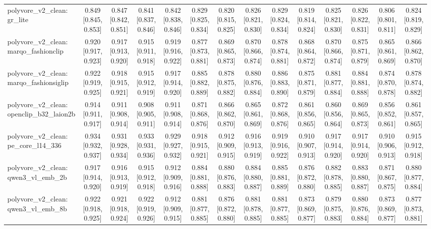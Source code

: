 \begin{table}[t]
\begin{tabular}{lccccccccccccc}
polyvore\_v2\_clean: gr\_lite & 0.849 [0.845, 0.853] & 0.847 [0.842, 0.851] & 0.841 [0.837, 0.846] & 0.842 [0.838, 0.846] & 0.829 [0.825, 0.834] & 0.820 [0.815, 0.825] & 0.826 [0.821, 0.830] & 0.829 [0.824, 0.834] & 0.819 [0.814, 0.824] & 0.825 [0.821, 0.830] & 0.826 [0.822, 0.831] & 0.806 [0.801, 0.811] & 0.824 [0.819, 0.829] \\
polyvore\_v2\_clean: marqo\_fashionclip & 0.920 [0.917, 0.923] & 0.917 [0.913, 0.920] & 0.915 [0.911, 0.918] & 0.919 [0.916, 0.922] & 0.877 [0.873, 0.881] & 0.869 [0.865, 0.873] & 0.870 [0.866, 0.874] & 0.878 [0.874, 0.881] & 0.868 [0.864, 0.872] & 0.870 [0.866, 0.874] & 0.875 [0.871, 0.879] & 0.865 [0.861, 0.869] & 0.866 [0.862, 0.870] \\
polyvore\_v2\_clean: marqo\_fashionsiglip & 0.922 [0.919, 0.925] & 0.918 [0.915, 0.921] & 0.915 [0.912, 0.919] & 0.917 [0.914, 0.920] & 0.885 [0.882, 0.889] & 0.878 [0.875, 0.882] & 0.880 [0.876, 0.884] & 0.886 [0.883, 0.890] & 0.875 [0.871, 0.879] & 0.881 [0.877, 0.884] & 0.884 [0.881, 0.888] & 0.874 [0.870, 0.878] & 0.878 [0.874, 0.882] \\
polyvore\_v2\_clean: openclip\_b32\_laion2b & 0.914 [0.911, 0.917] & 0.911 [0.908, 0.914] & 0.908 [0.905, 0.911] & 0.911 [0.908, 0.914] & 0.871 [0.868, 0.876] & 0.866 [0.862, 0.870] & 0.865 [0.861, 0.869] & 0.872 [0.868, 0.876] & 0.861 [0.856, 0.865] & 0.860 [0.856, 0.864] & 0.869 [0.865, 0.873] & 0.856 [0.852, 0.861] & 0.861 [0.857, 0.865] \\
polyvore\_v2\_clean: pe\_core\_l14\_336 & 0.934 [0.932, 0.937] & 0.931 [0.928, 0.934] & 0.933 [0.931, 0.936] & 0.929 [0.927, 0.932] & 0.918 [0.915, 0.921] & 0.912 [0.909, 0.915] & 0.916 [0.913, 0.919] & 0.919 [0.916, 0.922] & 0.910 [0.907, 0.913] & 0.917 [0.914, 0.920] & 0.917 [0.914, 0.920] & 0.910 [0.906, 0.913] & 0.915 [0.912, 0.918] \\
polyvore\_v2\_clean: qwen3\_vl\_emb\_2b & 0.917 [0.914, 0.920] & 0.916 [0.913, 0.919] & 0.915 [0.912, 0.918] & 0.912 [0.909, 0.916] & 0.884 [0.881, 0.888] & 0.880 [0.876, 0.883] & 0.884 [0.880, 0.887] & 0.885 [0.881, 0.889] & 0.876 [0.872, 0.880] & 0.882 [0.878, 0.885] & 0.883 [0.880, 0.887] & 0.871 [0.867, 0.875] & 0.880 [0.877, 0.884] \\
polyvore\_v2\_clean: qwen3\_vl\_emb\_8b & 0.922 [0.918, 0.925] & 0.921 [0.918, 0.924] & 0.922 [0.919, 0.926] & 0.912 [0.909, 0.915] & 0.881 [0.877, 0.885] & 0.876 [0.872, 0.880] & 0.881 [0.878, 0.885] & 0.881 [0.877, 0.885] & 0.873 [0.869, 0.877] & 0.879 [0.875, 0.883] & 0.880 [0.876, 0.884] & 0.873 [0.869, 0.877] & 0.877 [0.873, 0.881] \\

\end{tabular}
\end{table}
